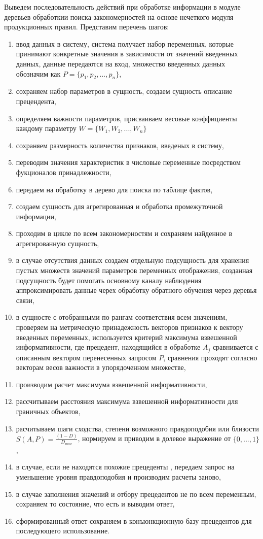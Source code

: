Выведем последовательность действий при обработке информации в модуле деревьев обработкии поиска закономерностей на основе нечеткого модуля продукционных правил. Представим перечень шагов:
\begin{enumerate}
    \item ввод данных в систему, система получает набор переменных, которые принимают конкретные значения в зависимости от значений введенных данных, данные передаются на вход, множество введенных данных обозначим как $P =\{p_1, p_2, ..., p_n\}$,
    \item сохраняем набор параметров в сущность, создаем сущность описание прецендента,
    \item определяем важности параметров, присваиваем весовые коэффициенты каждому параметру $W = \{W_1, W_2, ..., W_n\}$
    \item сохраняем размерность количества признаков, введеных в систему,
    \item переводим значения характеристик в числовые переменные посредством фукционалов принадлежности,
    \item передаем на обработку в дерево для поиска по таблице фактов,
    \item создаем сущность для агрегированная и обработка промежуточной информации, 
    \item проходим в цикле по всем закономерностям и сохраняем найденное в агрегированную сущность,
    \item в случае отсутствия данных создаем отдельную подсущность для хранения пустых множеств значений параметров переменных отображения, созданная подсущность будет помогать основному каналу наблюдения аппроксимировать данные черех обработку обратного обучения через деревья связи,
    \item в сущносте с отобранными по рангам соответствия всем значениям, проверяем на метрическую принадежность векторов признаков к вектору введенных переменных, используется критерий максимума взвешенной информативности, где прецедент, находящийся в обработке $A_j$ сравнивается с описанным вектором перенесенных запросом $P$, сравнения проходят согласно векторам весов важности в упорядоченном множестве,
    \item производим расчет максимума взвешенной информативности, 
    \item рассчитываем расстояния максимума взвешенной информативности для граничных объектов,
    \item расчитываем шаги сходства, степени возможного правдоподобия или близости $S(A,P) = \frac{(1-D)}{D_{max}}$, нормируем и приводим в долевое выражение от $\{0, ..., 1\}$,
    \item в случае, если не находятся похожие прецеденты , передаем запрос на уменьшение уровня правдоподобия и производим расчеты заново,
    \item в случае заполнения значений и отбору прецедентов не по всем переменным, сохраняем то состояние, что есть и выводим ответ,
    \item сформированный ответ сохраняем в конъюнкционную базу прецедентов для последующего использование.
\end{enumerate}

